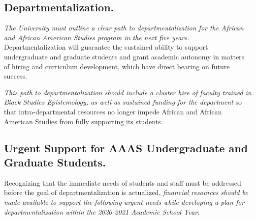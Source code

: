 \documentclass[12pt, titlepage, letterpaper]{article}
\begin{document}
\subsection*{Departmentalization.}
%

\textit{The University must outline a clear path to departmentalization for the African and African American Studies program in the next five years.} Departmentalization will guarantee the sustained ability to support undergraduate and graduate students and grant academic autonomy in matters of hiring and curriculum development, which have direct bearing on future success. 

\textit{This path to departmentalization should include a cluster hire of faculty trained in Black Studies Epistemology, as well as sustained funding for the department} so that intra-departmental resources no longer impede African and African American Studies from fully supporting its students.


\subsection*{Urgent Support for AAAS Undergraduate and Graduate Students.}
%



Recognizing that the immediate needs of students and staff must be addressed before the goal of departmentalization is actualized, \textit{financial resources should be made available to support the following urgent needs while developing a plan for departmentalization within the 2020-2021 Academic School Year}:
\end{document}
